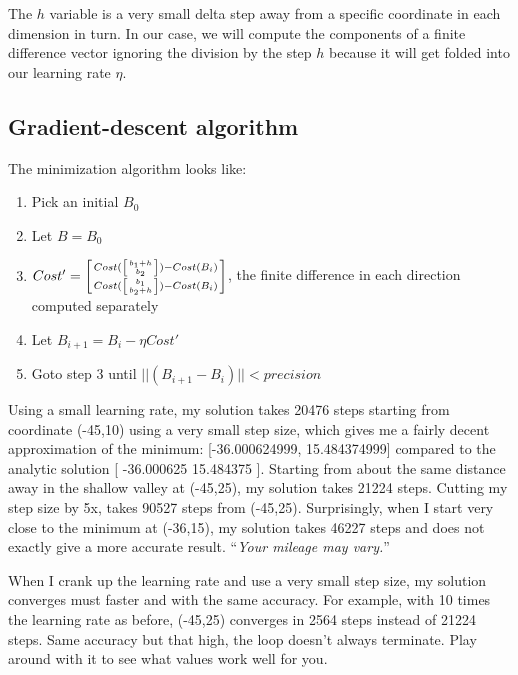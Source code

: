 \documentclass[titlepage]{tufte-book}
\begin{document}
\begin{fullwidth}
\noindent The $h$ variable is a very small delta step away from a specific coordinate in each dimension in turn. In our case, we will compute the components of a finite difference vector ignoring the division by the step $h$ because it will get folded into our learning rate $\eta$.

\subsection{Gradient-descent algorithm}

The minimization algorithm looks like:

\begin{enumerate}
\item Pick an initial $B_0$
\item Let $B = B_0$
\item $Cost' = \left[ Cost(\left[ b_1+h \above 0pt{b_2} \right]) - Cost(B_i) \above 0pt Cost(\left[ b_1 \above 0pt{b_2+h} \right]) - Cost(B_i) \right]$, the finite difference in each direction computed separately
\item Let $B_{i+1} = B_i - \eta Cost'$
\item Goto step 3 until $||(B_{i+1}-B_i)|| < precision$
\end{enumerate}

Using a small learning rate, my solution takes 20476 steps starting from coordinate (-45,10) using a very small step size, which gives me a fairly decent approximation of the minimum: [-36.000624999, 15.484374999] compared to the analytic solution [ -36.000625 15.484375 ]. Starting from about the same distance away in the shallow valley at (-45,25), my solution takes 21224 steps. Cutting my step size by 5x, takes 90527 steps from (-45,25). Surprisingly, when I start very close to the minimum at (-36,15), my solution takes 46227 steps and does not exactly give a more accurate result. ``{\em Your mileage may vary.}''



When I crank up the learning rate and use a very small step size, my solution converges must faster and with the same accuracy. For example, with 10 times the learning rate as before, (-45,25) converges in 2564 steps instead of 21224 steps. Same accuracy but that high, the loop doesn't always terminate. Play around with it to see what values work well for you.


\end{fullwidth}
\end{document}
